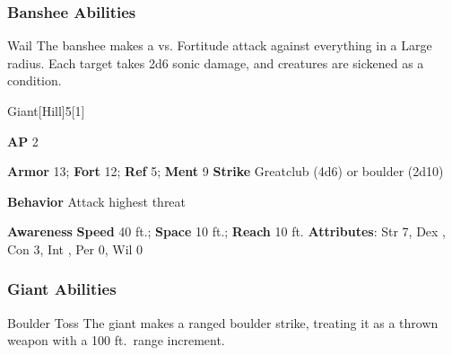\subsubsection{Banshee Abilities}

\begin{freeability}{Wail}
The banshee makes a  vs. Fortitude attack against everything in a Large radius.
\hit Each target takes 2d6 sonic damage, and creatures are sickened as a condition.
\end{freeability}

\begin{monsection}{Giant}[Hill]{5}[1]
\vspace{-1em}\vspace{-1em}
\begin{spellcontent}
\begin{spelltargetinginfo}
{\textbf{AP} 2}

\pari \textbf{Armor} 13;
\textbf{Fort} 12;
\textbf{Ref} 5;
\textbf{Ment} 9
\pari \textbf{Strike} Greatclub  (4d6) or boulder  (2d10)



\pari \textbf{Behavior} Attack highest threat
\end{spelltargetinginfo}
\end{spellcontent}

\begin{monsterfooter}
\pari \textbf{Awareness} 
\pari \textbf{Speed} 40 ft.;
\textbf{Space} 10 ft.;
\textbf{Reach} 10 ft.
\pari \textbf{Attributes}:
Str 7,
Dex ,
Con 3,
Int ,
Per 0,
Wil 0
\end{monsterfooter}
\end{monsection}


\subsubsection{Giant Abilities}

\begin{freeability}{Boulder Toss}
The giant makes a ranged boulder strike, treating it as a thrown weapon with a 100 ft.\ range increment.
\end{freeability}

